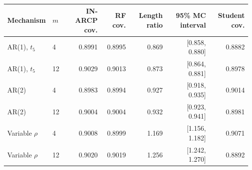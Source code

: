 \begin{tabular}{llrrrrr}
\toprule
Mechanism & $m$ & IN-ARCP cov. & RF cov. & Length ratio & 95\% MC interval & Student cov. \\
\midrule
AR(1), $t_5$ & 4 & 0.8991 & 0.8995 & 0.869 & [0.858, 0.880] & 0.8882 \\
AR(1), $t_5$ & 12 & 0.9029 & 0.9013 & 0.873 & [0.864, 0.881] & 0.8978 \\
AR(2) & 4 & 0.8983 & 0.8994 & 0.927 & [0.918, 0.935] & 0.9014 \\
AR(2) & 12 & 0.9004 & 0.9004 & 0.932 & [0.923, 0.941] & 0.8981 \\
Variable $\rho$ & 4 & 0.9008 & 0.8999 & 1.169 & [1.156, 1.182] & 0.9071 \\
Variable $\rho$ & 12 & 0.9020 & 0.9019 & 1.256 & [1.242, 1.270] & 0.8892 \\
\bottomrule
\end{tabular}
